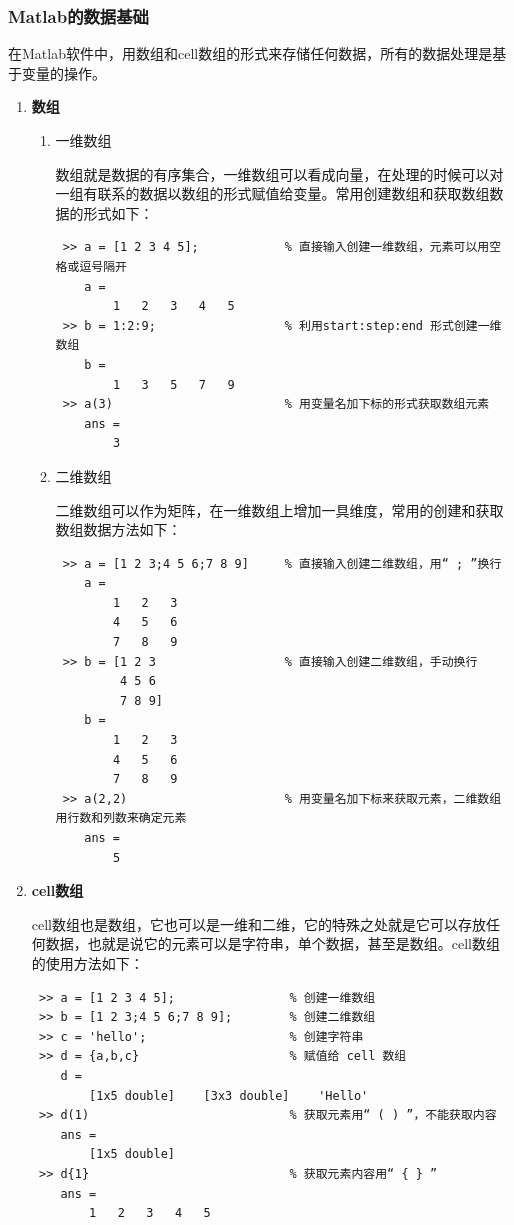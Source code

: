 \subsubsection{Matlab的数据基础}
在Matlab软件中，用数组和cell数组的形式来存储任何数据，所有的数据处理是基于变量的操作。
\begin{enumerate}
	\item \textbf{数组}
	\begin{enumerate}
		\item 一维数组
		
		\qquad 数组就是数据的有序集合，一维数组可以看成向量，在处理的时候可以对一组有联系的数据以数组的形式赋值给变量。常用创建数组和获取数组数据的形式如下：
		\begin{lstlisting}
 >> a = [1 2 3 4 5];			% 直接输入创建一维数组，元素可以用空格或逗号隔开
    a = 
		1	2	3	4	5
 >> b = 1:2:9;					% 利用start:step:end 形式创建一维数组
	b =
		1	3	5	7	9
 >> a(3)						% 用变量名加下标的形式获取数组元素
 	ans = 
 		3\end{lstlisting}
		\item 二维数组
		
		\qquad 二维数组可以作为矩阵，在一维数组上增加一具维度，常用的创建和获取数组数据方法如下：
		\begin{lstlisting}
 >> a = [1 2 3;4 5 6;7 8 9]		% 直接输入创建二维数组，用“ ; ”换行
    a = 
    	1	2	3
    	4	5	6
    	7	8	9
 >> b = [1 2 3					% 直接输入创建二维数组，手动换行
 		 4 5 6
 		 7 8 9]
	b = 
	 	1	2	3
	 	4	5	6
	 	7	8	9
 >> a(2,2)						% 用变量名加下标来获取元素，二维数组用行数和列数来确定元素
 	ans = 
 		5\end{lstlisting}
	\end{enumerate}
	\item \textbf{cell数组}
	
	\qquad cell数组也是数组，它也可以是一维和二维，它的特殊之处就是它可以存放任何数据，也就是说它的元素可以是字符串，单个数据，甚至是数组。cell数组的使用方法如下：
	\begin{lstlisting}
 >> a = [1 2 3 4 5];				% 创建一维数组
 >> b = [1 2 3;4 5 6;7 8 9];		% 创建二维数组
 >> c = 'hello';					% 创建字符串
 >> d = {a,b,c}						% 赋值给 cell 数组
 	d = 
 		[1x5 double]	[3x3 double]	'Hello'
 >> d(1)							% 获取元素用“ ( ) ”，不能获取内容
 	ans =
 		[1x5 double]
 >> d{1}							% 获取元素内容用“ { } ”
 	ans =
 		1	2	3	4	5\end{lstlisting}
\end{enumerate}
